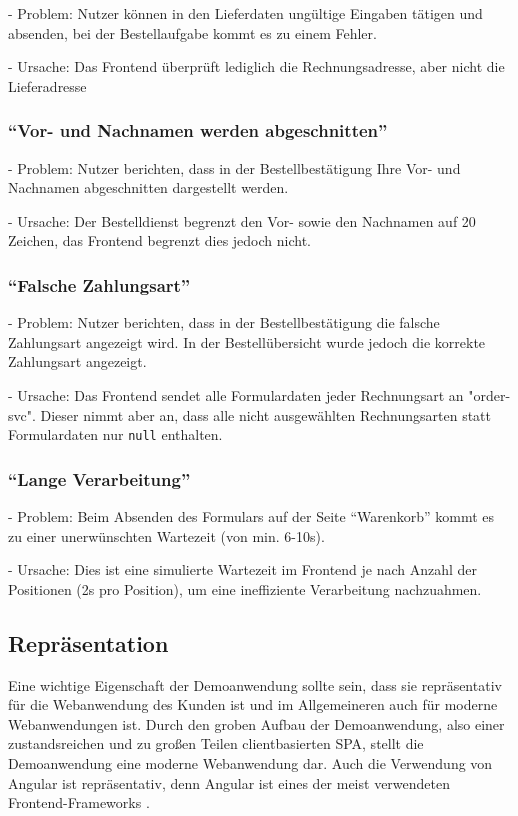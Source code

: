 - Problem: Nutzer können in den Lieferdaten ungültige Eingaben tätigen und absenden, bei der Bestellaufgabe kommt es zu einem Fehler.

- Ursache: Das Frontend überprüft lediglich die Rechnungsadresse, aber nicht die Lieferadresse

\subsubsection{\enquote{Vor- und Nachnamen werden abgeschnitten}}

- Problem: Nutzer berichten, dass in der Bestellbestätigung Ihre Vor- und Nachnamen abgeschnitten dargestellt werden.

- Ursache: Der Bestelldienst begrenzt den Vor- sowie den Nachnamen auf 20 Zeichen, das Frontend begrenzt dies jedoch nicht.

\subsubsection{\enquote{Falsche Zahlungsart}}

- Problem: Nutzer berichten, dass in der Bestellbestätigung die falsche Zahlungsart angezeigt wird. In der Bestellübersicht wurde jedoch die korrekte Zahlungsart angezeigt.

- Ursache: Das Frontend sendet alle Formulardaten jeder Rechnungsart an "order-svc". Dieser nimmt aber an, dass alle nicht ausgewählten Rechnungsarten statt Formulardaten nur \texttt{null} enthalten.

\subsubsection{\enquote{Lange Verarbeitung}}

- Problem: Beim Absenden des Formulars auf der Seite \enquote{Warenkorb} kommt es zu einer unerwünschten Wartezeit (von min. 6-10s).

- Ursache: Dies ist eine simulierte Wartezeit im Frontend je nach Anzahl der Positionen (2s pro Position), um eine ineffiziente Verarbeitung nachzuahmen.

\subsection{Repräsentation}

Eine wichtige Eigenschaft der Demoanwendung sollte sein, dass sie repräsentativ für die Webanwendung des Kunden ist und im Allgemeineren auch für moderne Webanwendungen ist. Durch den groben Aufbau der Demoanwendung, also einer zustandsreichen und zu großen Teilen clientbasierten SPA, stellt die Demoanwendung eine moderne Webanwendung dar. Auch die Verwendung von Angular ist repräsentativ, denn Angular ist eines der meist verwendeten Frontend-Frameworks \cite{TheStateOfJavaScript2020}.

